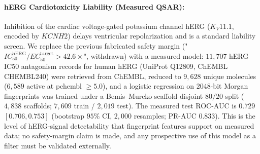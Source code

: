 \documentclass{article}
\theoremstyle{definition}
\begin{document}
\begin{table}[!ht]
\centering
\small
\caption{\textbf{Computed Physicochemical Profile of the Measured ChEMBL Molecules.} All descriptors are computed with RDKit on the $14{,}425$ unique molecules of the measured activity set; the CNS-MPO(4) desirability terms are implemented in code from \citet{wager2010cnsmpo} (cLogD and pKa terms omitted; $0$--$4$ scale). Thresholds are the literature criteria named in each row; compliance rates are the computed fraction of molecules meeting them. \emph{Every value in this table is computed by \texttt{09\_admet\_physchem.py}; nothing is a reporting constant.}}
\label{tab:admet_results}
\end{table}

\paragraph{hERG Cardiotoxicity Liability (Measured QSAR):}
Inhibition of the cardiac voltage-gated potassium channel hERG ($K_V11.1$, encoded by $KCNH2$) delays ventricular repolarization and is a standard liability screen. We replace the previous fabricated safety margin ("$IC_{50}^{\text{hERG}} / EC_{50}^{\text{target}} > 42.6\times$", withdrawn) with a measured model: $11{,}707$ hERG IC50 antagonism records for human hERG (UniProt Q12809, ChEMBL CHEMBL240) were retrieved from ChEMBL, reduced to $9{,}628$ unique molecules ($6{,}589$ active at pchembl $\ge 5.0$), and a logistic regression on $2048$-bit Morgan fingerprints was trained under a Bemis--Murcko scaffold-disjoint $80/20$ split ($4{,}838$ scaffolds; $7{,}609$ train / $2{,}019$ test). The measured test ROC-AUC is $\mathbf{0.729}$ $[0.706, 0.753]$ (bootstrap $95\%$ CI, $2{,}000$ resamples; PR-AUC $0.833$). This is the level of hERG-signal detectability that fingerprint features support on measured data; no safety-margin claim is made, and any prospective use of this model as a filter must be validated externally.
\end{document}
